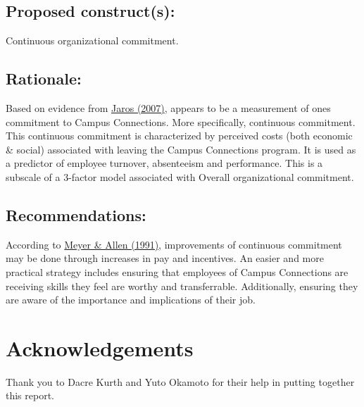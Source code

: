 \documentclass[]{article}
\begin{document}
\subsection{\texorpdfstring{\textbf{Proposed
construct(s)}:}{Proposed construct(s):}}\label{proposed-constructs-7}

Continuous organizational commitment.

\subsection{\texorpdfstring{\textbf{Rationale}:}{Rationale:}}\label{rationale-7}

Based on evidence from
\href{https://pdfs.semanticscholar.org/7546/2d9094b420466ad68c404527c7b6cb38d040.pdf}{Jaros
(2007)}, appears to be a measurement of ones commitment to Campus
Connections. More specifically, continuous commitment. This continuous
commitment is characterized by perceived costs (both economic \& social)
associated with leaving the Campus Connections program. It is used as a
predictor of employee turnover, absenteeism and performance. This is a
subscale of a 3-factor model associated with Overall organizational
commitment.

\subsection{\texorpdfstring{\textbf{Recommendations}:}{Recommendations:}}\label{recommendations-7}

According to
\href{http://www.m5zn.com/newuploads/2015/10/04/pdf/400c5edfcd96289.pdf}{Meyer
\& Allen (1991)}, improvements of continuous commitment may be done
through increases in pay and incentives. An easier and more practical
strategy includes ensuring that employees of Campus Connections are
receiving skills they feel are worthy and transferrable. Additionally,
ensuring they are aware of the importance and implications of their job.

\section{Acknowledgements}\label{acknowledgements}

Thank you to Dacre Kurth and Yuto Okamoto for their help in putting
together this report.
\end{document}
